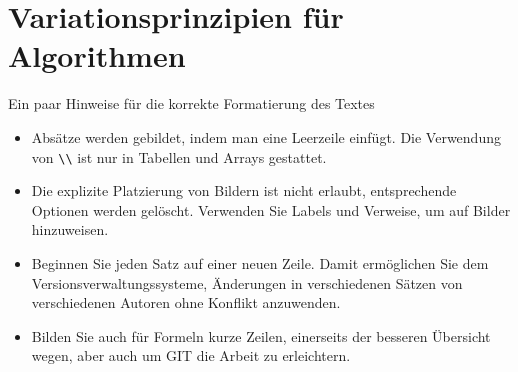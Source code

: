 %
%
%
%
\chapter{Variationsprinzipien für Algorithmen\label{chapter:beispiel}}
\begin{refsection}

Ein paar Hinweise für die korrekte Formatierung des Textes
\begin{itemize}
\item
Absätze werden gebildet, indem man eine Leerzeile einfügt.
Die Verwendung von \verb+\\+ ist nur in Tabellen und Arrays gestattet.
\item
Die explizite Platzierung von Bildern ist nicht erlaubt, entsprechende
Optionen werden gelöscht. 
Verwenden Sie Labels und Verweise, um auf Bilder hinzuweisen.
\item
Beginnen Sie jeden Satz auf einer neuen Zeile. 
Damit ermöglichen Sie dem Versionsverwaltungssysteme, Änderungen
in verschiedenen Sätzen von verschiedenen Autoren ohne Konflikt 
anzuwenden.
\item 
Bilden Sie auch für Formeln kurze Zeilen, einerseits der besseren
Übersicht wegen, aber auch um GIT die Arbeit zu erleichtern.
\end{itemize}






\printbibliography[heading=subbibliography]
\end{refsection}

